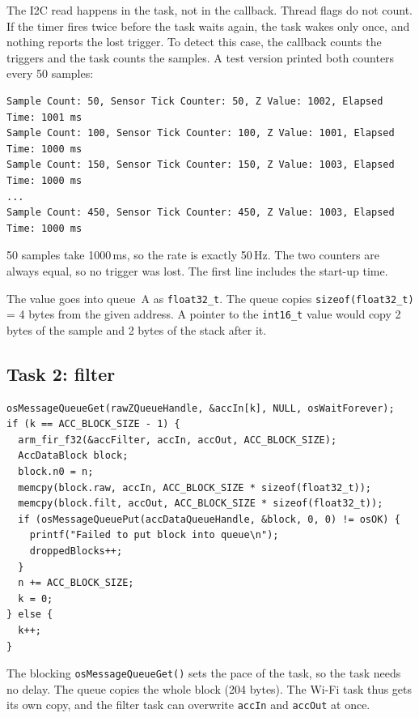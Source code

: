 \documentclass[11pt,a4paper]{article}
\begin{document}
The I2C read happens in the task, not in the callback. Thread flags do not
count. If the timer fires twice before the task waits again, the task wakes
only once, and nothing reports the lost trigger. To detect this case, the
callback counts the triggers and the task counts the samples. A test version
printed both counters every 50 samples:

\begin{lstlisting}[style=plain,basicstyle=\ttfamily\scriptsize,caption={Test of task 1 (board flat on the table).}]
Sample Count: 50, Sensor Tick Counter: 50, Z Value: 1002, Elapsed Time: 1001 ms
Sample Count: 100, Sensor Tick Counter: 100, Z Value: 1001, Elapsed Time: 1000 ms
Sample Count: 150, Sensor Tick Counter: 150, Z Value: 1003, Elapsed Time: 1000 ms
...
Sample Count: 450, Sensor Tick Counter: 450, Z Value: 1003, Elapsed Time: 1000 ms
\end{lstlisting}

50 samples take 1000\,ms, so the rate is exactly 50\,Hz. The two counters are
always equal, so no trigger was lost. The first line includes the start-up
time.

The value goes into queue~A as \texttt{float32\_t}. The queue copies
\texttt{sizeof(float32\_t)} = 4 bytes from the given address. A pointer to the
\texttt{int16\_t} value would copy 2 bytes of the sample and 2 bytes of the
stack after it.

\subsection{Task 2: filter}

\begin{lstlisting}[caption={Filter task (comments and old test code removed).}]
osMessageQueueGet(rawZQueueHandle, &accIn[k], NULL, osWaitForever);
if (k == ACC_BLOCK_SIZE - 1) {
  arm_fir_f32(&accFilter, accIn, accOut, ACC_BLOCK_SIZE);
  AccDataBlock block;
  block.n0 = n;
  memcpy(block.raw, accIn, ACC_BLOCK_SIZE * sizeof(float32_t));
  memcpy(block.filt, accOut, ACC_BLOCK_SIZE * sizeof(float32_t));
  if (osMessageQueuePut(accDataQueueHandle, &block, 0, 0) != osOK) {
    printf("Failed to put block into queue\n");
    droppedBlocks++;
  }
  n += ACC_BLOCK_SIZE;
  k = 0;
} else {
  k++;
}
\end{lstlisting}

The blocking \texttt{osMessageQueueGet()} sets the pace of the task, so the
task needs no delay. The queue copies the whole block (204 bytes). The Wi-Fi
task thus gets its own copy, and the filter task can overwrite
\texttt{accIn} and \texttt{accOut} at once.
\end{document}
